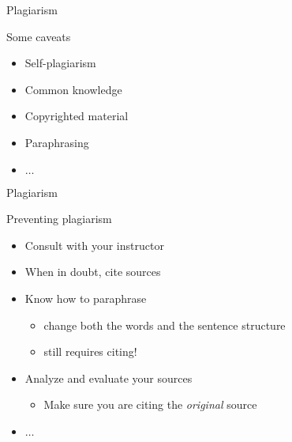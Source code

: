 	\begin{frame}{Plagiarism}
		
		Some caveats

		\begin{itemize}
			\item 
				Self-plagiarism
			\item 
				Common knowledge
			\item 
				Copyrighted material
			\item 
				Paraphrasing
			\item 
				$\ldots$
		\end{itemize}

	\end{frame}

	\begin{frame}{Plagiarism}
		
		Preventing plagiarism

		\begin{itemize}
			\item 
				Consult with your instructor
			\item 
				When in doubt, cite sources
			\item 
				Know how to paraphrase
				\begin{itemize}
					\item 
						change both the words and the sentence structure
					\item 
						still requires citing!
				\end{itemize}
			\item 
				Analyze and evaluate your sources
				\begin{itemize}
					\item 
						Make sure you are citing the \emph{original} source
				\end{itemize}
			\item 
				$\ldots$
		\end{itemize}

	\end{frame}

